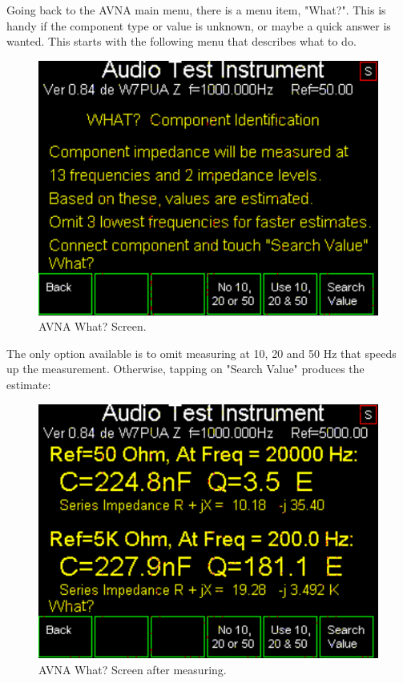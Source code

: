 Going back to the AVNA main menu, there is a menu item, "What?".  This is handy if the component type or value is unknown, or maybe a quick answer is wanted.  This starts with the following menu that describes what to do.
\begin{figure}[H]
\begin{center}
\includegraphics[scale=0.75]{./images/AVNA_012.pdf}
\caption{AVNA What? Screen.}
\label{AVNA_012-label}
\end{center}
\end{figure}
%
The only option available is to omit measuring at 10, 20 and 50 Hz that speeds up the measurement.
Otherwise, tapping on "Search Value" produces the estimate:
\begin{figure}[H]
\begin{center}
\includegraphics[scale=0.75]{./images/AVNA_013.pdf}
\caption{AVNA What? Screen after measuring.}
\label{AVNA_013-label}
\end{center}
\end{figure}
